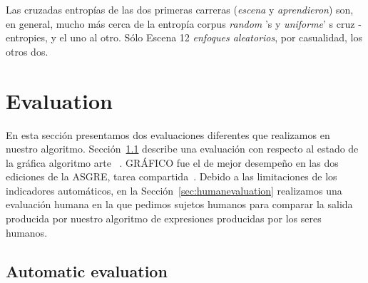 Las cruzadas entrop\'{i}as de las dos primeras carreras (\emph{escena} y \emph{aprendieron}) son, en general, mucho m\'as cerca de la entrop\'{i}a corpus \emph{random} 's y \emph{uniforme}' s cruz -entropies, y el uno al otro. S\'olo Escena 12 \emph{enfoques aleatorios}, por casualidad, los otros dos.


\section{Evaluation} \label{sec:evaluation}

%  
En esta secci\'on presentamos dos evaluaciones diferentes que realizamos en nuestro algoritmo. Secci\'on~\ref{sec:automaticevaluation} describe una evaluaci\'on con respecto al estado de la gr\'afica algoritmo arte~\cite{KrahmerGRAPH} . GR\'AFICO fue el de mejor desempe\~no en las dos ediciones de la ASGRE, tarea compartida~\cite{GATT-balz-Kow:2008:Ampl}. Debido a las limitaciones de los indicadores autom\'aticos, en la Secci\'on~\ref{sec:humanevaluation} realizamos una evaluaci\'on humana en la que pedimos sujetos humanos para comparar la salida producida por nuestro algoritmo de expresiones producidas por los seres humanos.
\subsection{Automatic evaluation} \label{sec:automaticevaluation}


